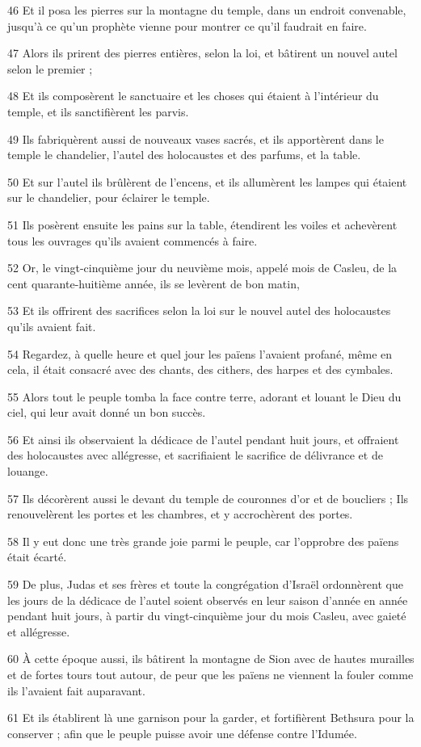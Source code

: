 \par 46 Et il posa les pierres sur la montagne du temple, dans un endroit convenable, jusqu'à ce qu'un prophète vienne pour montrer ce qu'il faudrait en faire.
\par 47 Alors ils prirent des pierres entières, selon la loi, et bâtirent un nouvel autel selon le premier ;
\par 48 Et ils composèrent le sanctuaire et les choses qui étaient à l'intérieur du temple, et ils sanctifièrent les parvis.
\par 49 Ils fabriquèrent aussi de nouveaux vases sacrés, et ils apportèrent dans le temple le chandelier, l'autel des holocaustes et des parfums, et la table.
\par 50 Et sur l'autel ils brûlèrent de l'encens, et ils allumèrent les lampes qui étaient sur le chandelier, pour éclairer le temple.
\par 51 Ils posèrent ensuite les pains sur la table, étendirent les voiles et achevèrent tous les ouvrages qu'ils avaient commencés à faire.
\par 52 Or, le vingt-cinquième jour du neuvième mois, appelé mois de Casleu, de la cent quarante-huitième année, ils se levèrent de bon matin,
\par 53 Et ils offrirent des sacrifices selon la loi sur le nouvel autel des holocaustes qu'ils avaient fait.
\par 54 Regardez, à quelle heure et quel jour les païens l'avaient profané, même en cela, il était consacré avec des chants, des cithers, des harpes et des cymbales.
\par 55 Alors tout le peuple tomba la face contre terre, adorant et louant le Dieu du ciel, qui leur avait donné un bon succès.
\par 56 Et ainsi ils observaient la dédicace de l'autel pendant huit jours, et offraient des holocaustes avec allégresse, et sacrifiaient le sacrifice de délivrance et de louange.
\par 57 Ils décorèrent aussi le devant du temple de couronnes d'or et de boucliers ; Ils renouvelèrent les portes et les chambres, et y accrochèrent des portes.
\par 58 Il y eut donc une très grande joie parmi le peuple, car l'opprobre des païens était écarté.
\par 59 De plus, Judas et ses frères et toute la congrégation d'Israël ordonnèrent que les jours de la dédicace de l'autel soient observés en leur saison d'année en année pendant huit jours, à partir du vingt-cinquième jour du mois Casleu, avec gaieté et allégresse.
\par 60 À cette époque aussi, ils bâtirent la montagne de Sion avec de hautes murailles et de fortes tours tout autour, de peur que les païens ne viennent la fouler comme ils l'avaient fait auparavant.
\par 61 Et ils établirent là une garnison pour la garder, et fortifièrent Bethsura pour la conserver ; afin que le peuple puisse avoir une défense contre l'Idumée.

